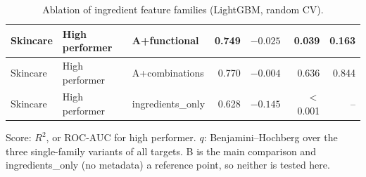 \begin{table}[htbp]
\begin{tabular}{|l|l|l|r|r|r|r|}
\hline
Skincare & High performer & A+functional & 0.749 & $-0.025$ & 0.039 & 0.163 \\
\hline
Skincare & High performer & A+combinations & 0.770 & $-0.004$ & 0.636 & 0.844 \\
\hline
Skincare & High performer & ingredients\_only & 0.628 & $-0.145$ & $<$0.001 & -- \\
\hline
\end{tabular}
\par\smallskip
\parbox{0.95\linewidth}{\footnotesize Score: $R^2$, or ROC-AUC for high performer. $q$: Benjamini--Hochberg over the three single-family variants of all targets. B is the main comparison and ingredients\_only (no metadata) a reference point, so neither is tested here.}
\caption{Ablation of ingredient feature families (LightGBM, random CV).}
\label{tab:ablation}
\end{table}
